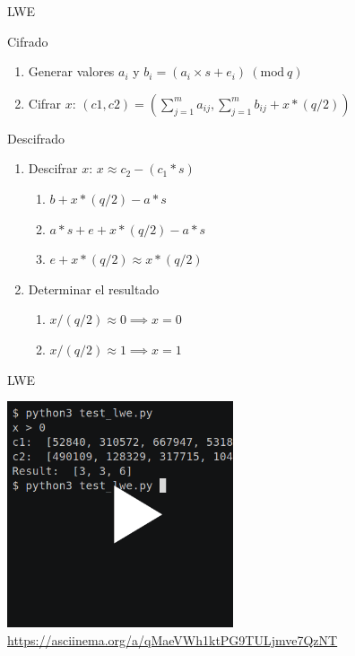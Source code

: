 \documentclass{beamer}
\newcommand{\Mod}[1]{\ (\mathrm{mod}\ #1)}
\begin{document}
\begin{frame}{LWE}

    \begin{block}{Cifrado}
        \begin{enumerate}
            \item Generar valores $ a_i $ y $ b_i = (a_i \times s + e_i) \Mod{q} $
            \item Cifrar $ x $: $ (c1, c2) = (\sum_{j=1}^{m} a_{ij}, \sum_{j=1}^{m} b_{ij} + x * (q/2)) $
        \end{enumerate}
    \end{block}

    \begin{block}{Descifrado}
        \begin{enumerate}
            \item Descifrar $x$: $ x \approx c_2 - (c_1*s) $
            \begin{enumerate}
                \item $ b + x*(q/2) - a*s $
                \item $ a*s + e + x*(q/2) - a*s $
                \item $ e + x*(q/2) \approx x * (q/2) $
            \end{enumerate}
            \item Determinar el resultado
            \begin{enumerate}
                \item $x/(q/2) \approx 0 \implies x=0$
                \item $x/(q/2) \approx 1 \implies x=1$
            \end{enumerate}
        \end{enumerate}
    \end{block}
    
\end{frame}

\begin{frame}{LWE}

    \href{https://asciinema.org/a/qMaeVWh1ktPG9TULjmve7QzNT}{
        \centering\includegraphics[width=0.5\textwidth]{test_lwe}
    }
    \centering\url{https://asciinema.org/a/qMaeVWh1ktPG9TULjmve7QzNT}

\end{frame}
\end{document}
